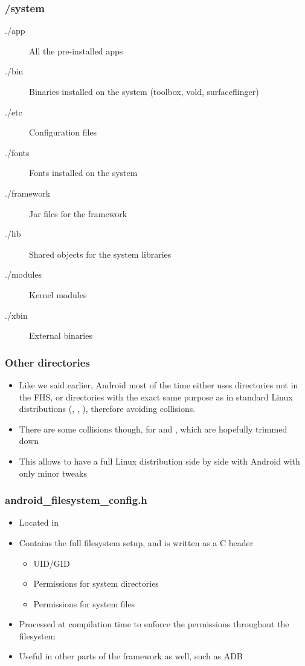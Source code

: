 \begin{frame}
  \frametitle{/system}
  \begin{description}
  \item[./app] All the pre-installed apps
  \item[./bin] Binaries installed on the system (toolbox, vold,
    surfaceflinger)
  \item[./etc] Configuration files
  \item[./fonts] Fonts installed on the system
  \item[./framework] Jar files for the framework
  \item[./lib] Shared objects for the system libraries
  \item[./modules] Kernel modules
  \item[./xbin] External binaries
  \end{description}
\end{frame}

\begin{frame}
  \frametitle{Other directories}
  \begin{itemize}
  \item Like we said earlier, Android most of the time either uses
    directories not in the FHS, or directories with the exact same purpose as in
    standard Linux distributions (, , ),
    therefore avoiding collisions.
  \item There are some collisions though, for  and
    , which are hopefully trimmed down
  \item This allows to have a full Linux distribution side by side
    with Android with only minor tweaks
  \end{itemize}
\end{frame}

\begin{frame}
  \frametitle{android\_filesystem\_config.h}
  \begin{itemize}
  \item Located in 
  \item Contains the full filesystem setup, and is written as a
    C header
    \begin{itemize}
    \item UID/GID
    \item Permissions for system directories
    \item Permissions for system files
    \end{itemize}
  \item Processed at compilation time to enforce the permissions throughout
    the filesystem
  \item Useful in other parts of the framework as well, such as ADB
  \end{itemize}
\end{frame}
